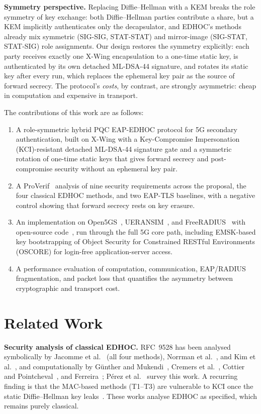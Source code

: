 \documentclass[symmetry,article,submit,moreauthors]{Definitions/mdpi}
\begin{document}
\textbf{Symmetry perspective.} Replacing Diffie--Hellman with a KEM breaks the role symmetry of key exchange: both Diffie--Hellman parties contribute a share, but a KEM implicitly authenticates only the decapsulator, and EDHOC's methods already mix symmetric (SIG-SIG, STAT-STAT) and mirror-image (SIG-STAT, STAT-SIG) role assignments. Our design restores the symmetry explicitly: each party receives exactly one X-Wing encapsulation to a one-time static key, is authenticated by its own detached ML-DSA-44 signature, and rotates its static key after every run, which replaces the ephemeral key pair as the source of forward secrecy. The protocol's \emph{costs}, by contrast, are strongly asymmetric: cheap in computation and expensive in transport.

The contributions of this work are as follows:
\begin{enumerate}
\item A role-symmetric hybrid PQC EAP-EDHOC protocol for 5G secondary authentication, built on X-Wing with a Key-Compromise Impersonation (KCI)-resistant detached ML-DSA-44 signature gate and a symmetric rotation of one-time static keys that gives forward secrecy and post-compromise security without an ephemeral key pair.
\item A ProVerif~\cite{blanchet2001proverif,blanchet2016automated} analysis of nine security requirements across the proposal, the four classical EDHOC methods, and two EAP-TLS baselines, with a negative control showing that forward secrecy rests on key erasure.
\item An implementation on Open5GS~\cite{Open5GS}, UERANSIM~\cite{UERANSIM}, and FreeRADIUS~\cite{FreeRADIUS} with open-source code~\cite{ProVerifSrc}, run through the full 5G core path, including EMSK-based key bootstrapping of Object Security for Constrained RESTful Environments (OSCORE) for login-free application-server access.
\item A performance evaluation of computation, communication, EAP/RADIUS fragmentation, and packet loss that quantifies the asymmetry between cryptographic and transport cost.
\end{enumerate}

\section{Related Work}
\label{sec:relatedwork}

\textbf{Security analysis of classical EDHOC.} RFC~9528 has been analysed symbolically by Jacomme et al.~\cite{JKK+23} (all four methods), Norrman et al.~\cite{NSB21}, and Kim et al.~\cite{KDL+21}, and computationally by G\"unther and Mukendi~\cite{GM23}, Cremers et al.~\cite{CDM24}, Cottier and Pointcheval~\cite{CP22}, and Ferreira~\cite{Fer24}; P\'erez et al.~\cite{PSM+24} survey this work. A recurring finding is that the MAC-based methods (T1--T3) are vulnerable to KCI once the static Diffie--Hellman key leaks~\cite{GM23,CDM24}. These works analyse EDHOC as specified, which remains purely classical.
\end{document}
